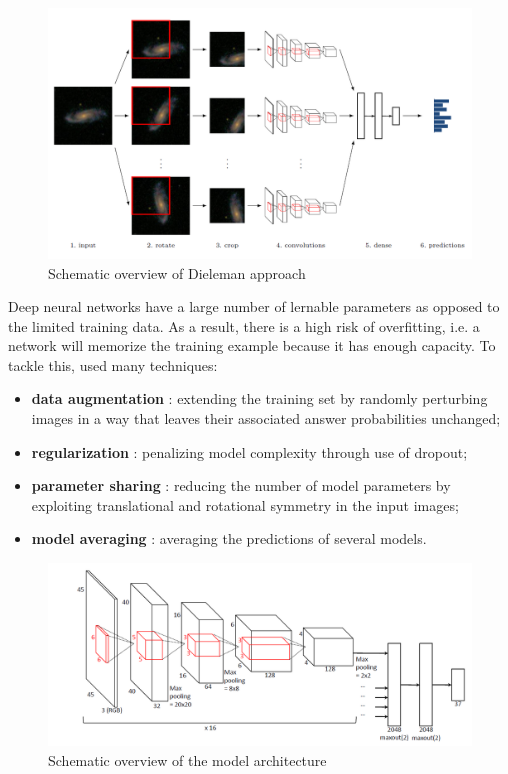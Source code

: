 \documentclass[a4paper,12pt]{report}
\begin{document}
\begin{figure}[h]
    \centering
    \includegraphics[width=\textwidth, height=.4\textheight]{figures/Dieleman.png}
    \caption{Schematic overview of Dieleman approach}
    \label{DielemanImg}
\end{figure}
\vspace{\baselineskip}
\hspace*{0.5 in}Deep neural networks have a large number of lernable parameters as opposed to the limited training data. As a result, there is a high risk of overfitting, i.e. a network will memorize the training example because it has enough capacity. To tackle this, \citet{Dieleman2015} used many techniques:
\vspace{\baselineskip}
\begin{itemize}
    \item \textbf{data augmentation} : extending the training set by randomly perturbing images in a way that leaves their associated answer probabilities unchanged;
    \item \textbf{regularization} : penalizing model complexity through use of dropout;
    \item \textbf{parameter sharing} : reducing the number of model parameters by exploiting translational and rotational symmetry in the input images;
    \item \textbf{model averaging} : averaging the predictions of several models.
\end{itemize}

\begin{figure}[h]
    \centering
    \includegraphics[width=\textwidth, height=.4\textheight]{figures/Dieleman_model.png}
    \caption{Schematic overview of the model architecture}
    \label{DielemanModel}
\end{figure}
\end{document}
